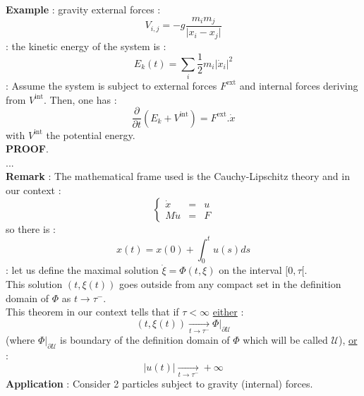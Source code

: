 \documentclass{report}
\newcommand*{\definition}[1]{\noindent\textbf{\color{cadmiumgreen}{#1}}}
\newcommand*{\theorem}[1]{\noindent\textbf{\color{purple}{#1}}}
\theoremstyle{plain}
\theoremstyle{definition}
\theoremstyle{remark}
\begin{document}
\textbf{Example} : gravity external forces : 
\begin{equation*}
V_{i,j}  = -g \frac{m_i m_j}{\vert x_i - x_j \vert}
\end{equation*}
\definition{Kinetic energy} : the kinetic energy of the system is :
\begin{equation}
E_k(t) = \sum_{i} \frac{1}{2} m_i \vert \dot{x}_i \vert^2
\end{equation}
\theorem{Theorem} : Assume the system is subject to external forces $F^{\text{ext}}$ and internal forces deriving from $V^{\text{int}}$. 
Then, one has :
\begin{equation}
\frac{\partial}{\partial t}(E_k + V^{\text{int}}) = F^{\text{ext}}.\dot{x}
\end{equation}
with $V^{\text{int}}$ the potential energy. \\
\textbf{PROOF}. \\
... \\
\textbf{Remark} : The mathematical frame used is the Cauchy-Lipschitz theory and in our context :
\begin{equation}
\left\lbrace
	\begin{array}{clc}
	\dot{x} &=& u \\
	M \dot{u} &=& F
	\end{array}
\right.
\end{equation}
so there is :
\begin{equation}
x(t) = x(0) + \int_0^t u(s) ds
\end{equation}
\theorem{"Théorème des bouts"} : let us define the maximal solution $\dot{\xi} = \Phi(t,\xi)$ on the interval $[0,\tau[$.\\ This solution $(t,\xi(t))$ goes outside from any compact set in the definition domain of $\Phi$ as $t \rightarrow \tau^{-}$.\\ 
This theorem in our context tells that if $\tau < \infty$ \underline{either} :
\begin{equation}
(t,\xi(t)) \xrightarrow[t \rightarrow \tau^{-}]{} \Phi\vert_{\partial\mathcal{U}}
\end{equation} (where $\Phi\vert_{\partial\mathcal{U}}$ is boundary of the definition domain of $\Phi$ which will be called $\mathcal{U}$), \underline{or} :
\begin{equation}
\vert u(t) \vert \xrightarrow[t \rightarrow \tau^{-}]{} +\infty
\end{equation} 
\textbf{Application} : Consider 2 particles subject to gravity (internal) forces.\\
\end{document}
